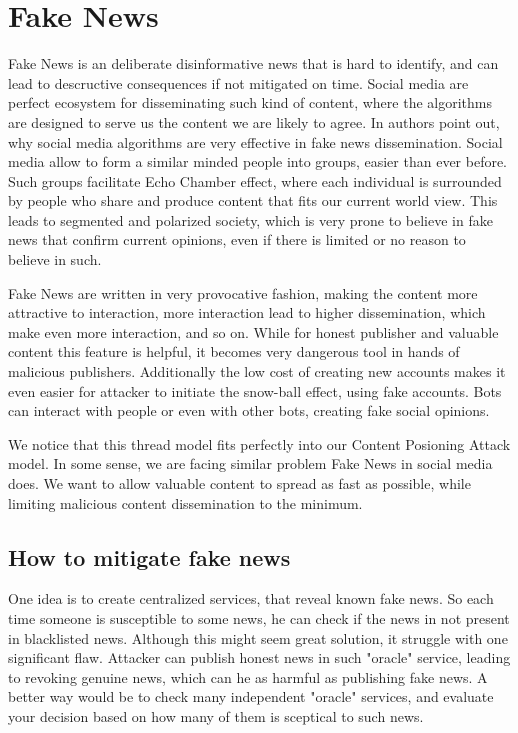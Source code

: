 \documentclass[nostrict]{szablonPG}
\begin{document}
\section{Fake News}
Fake News is an deliberate disinformative news that is hard to identify, and can lead to descructive consequences if not mitigated on time. Social media are perfect ecosystem for disseminating such kind of content, where the algorithms are designed to serve us the content we are likely to agree. In \cite{zhou2018fake} authors point out, why social media algorithms are very effective in fake news dissemination. Social media allow to form a similar minded people into groups, easier than ever before. Such groups facilitate Echo Chamber effect, where each individual is surrounded by people who share and produce content that fits our current world view. This leads to segmented and polarized society, which is very prone to believe in fake news that confirm current opinions, even if there is limited or no reason to believe in such. 


Fake News are written in very provocative fashion, making the content more attractive to interaction, more interaction lead to higher dissemination, which make even more interaction, and so on. While for honest publisher and valuable content this feature is helpful, it becomes very dangerous tool in hands of malicious publishers. Additionally the low cost of creating new accounts makes it even easier for attacker to initiate the snow-ball effect, using fake accounts. Bots can interact with people or even with other bots, creating fake social opinions.  

We notice that this thread model fits perfectly into our Content Posioning Attack model. In some sense, we are facing similar problem Fake News in social media does. We want to allow valuable content to spread as fast as possible, while limiting malicious content dissemination to the minimum.


\subsection{How to mitigate fake news}
One idea is to create centralized services, that reveal known fake news. So each time someone is susceptible to some news, he can check if the news in not present in blacklisted news. Although this might seem great solution, it struggle with one significant flaw. Attacker can publish honest news in such "oracle" service, leading to revoking genuine news, which can he as harmful as publishing fake news. A better way would be to check many independent "oracle" services, and evaluate your decision based on how many of them is sceptical to such news.
\end{document}
